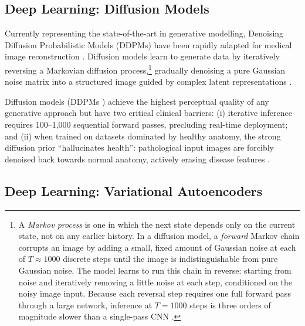 \documentclass[12pt, a4paper, twoside, openright]{book}
\begin{document}
\subsection{Deep Learning: Diffusion Models}
\label{sec:intro:existing:diffusion}

Currently representing the state-of-the-art in generative modelling, Denoising Diffusion
Probabilistic Models (DDPMs) have been rapidly adapted for medical image reconstruction
\cite{ho_denoising_2020, song_score-based_2021}. Diffusion models learn to generate data
by iteratively reversing a Markovian diffusion process,\footnote{A \emph{Markov process} is one in which the next state depends only on the current state, not on any earlier history. In a diffusion model, a \emph{forward} Markov chain corrupts an image by adding a small, fixed amount of Gaussian noise at each of $T \approx 1000$ discrete steps until the image is indistinguishable from pure Gaussian noise. The model learns to run this chain in reverse: starting from noise and iteratively removing a little noise at each step, conditioned on the noisy image input. Because each reversal step requires one full forward pass through a large network, inference at $T=1000$ steps is three orders of magnitude slower than a single-pass CNN \cite{ho_denoising_2020}.} gradually denoising a pure Gaussian
noise matrix into a structured image guided by complex latent representations
\cite{ho_denoising_2020}.

Diffusion models (DDPMs \cite{ho_denoising_2020}) achieve the highest perceptual quality of any generative approach but have two critical clinical barriers: (i) iterative inference requires 100--1,000 sequential forward passes, precluding real-time deployment; and (ii) when trained on datasets dominated by healthy anatomy, the strong diffusion prior ``hallucinates health'': pathological input images are forcibly denoised back towards normal anatomy, actively erasing disease features \cite{kazerouni_diffusion_2023, pfaff_no-new-denoiser_2024}. 

\subsection{Deep Learning: Variational Autoencoders}
\label{sec:intro:existing:vae}
\end{document}
